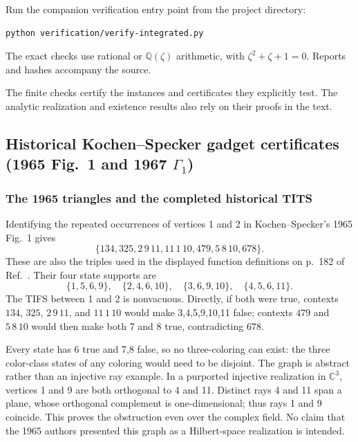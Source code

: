 \documentclass[aps,pra,reprint,superscriptaddress,longbibliography,nofootinbib,floatfix,10pt]{revtex4-2}
\theoremstyle{definition}
\newcommand{\C}{\mathbb{C}}
\newcommand{\Q}{\mathbb{Q}}
\begin{document}
Run the companion verification entry point from the project directory:
\begin{verbatim}
python verification/verify-integrated.py
\end{verbatim}
The exact checks use rational or $\Q(\zeta)$ arithmetic, with
$\zeta^2+\zeta+1=0$. Reports and hashes accompany the source.

The finite checks certify the instances and certificates they explicitly test.
The analytic realization and existence results also rely on their proofs in
the text.


\subsection{Historical Kochen--Specker gadget certificates (1965 Fig.~1 and 1967 \texorpdfstring{$\Gamma_1$}{Gamma1})}\label{app:historical-cert}
\subsubsection{The 1965 triangles and the completed historical TITS}\label{app:historical}
Identifying the repeated occurrences of vertices 1 and 2 in
Kochen--Specker's 1965 Fig.~1 gives
\begin{equation}\label{eq:ks1965}
 \{134,325,2\,9\,11,11\,1\,10,479,5\,8\,10,678\}.
\end{equation}
These are also the triples used in the displayed function definitions
on p.~182 of Ref.~\cite{kochen2}. Their four state supports are
\[
 \{1,5,6,9\},\quad\{2,4,6,10\},\quad
 \{3,6,9,10\},\quad\{4,5,6,11\}.
\]
The TIFS between 1 and 2 is nonvacuous. Directly, if both were true,
contexts $134$, $325$, $2\,9\,11$, and $11\,1\,10$ would make
3,4,5,9,10,11 false; contexts $479$ and $5\,8\,10$ would then make
both 7 and 8 true, contradicting $678$.

Every state has 6 true and 7,8 false, so no three-coloring can exist:
the three color-class states of any coloring would need to be disjoint.
The graph is abstract rather than an injective ray example. In a
purported injective realization in $\C^3$, vertices 1 and 9 are both
orthogonal to 4 and 11. Distinct rays 4 and 11 span a plane, whose
orthogonal complement is one-dimensional; thus rays 1 and 9 coincide.
This proves the obstruction even over the complex field. No claim that
the 1965 authors presented this graph as a Hilbert-space realization is
intended.
\end{document}
